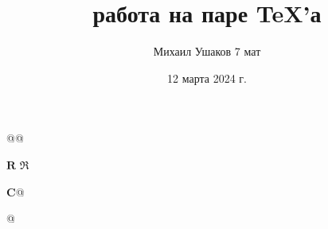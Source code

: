 \documentclass{article}
\title{\bfseries работа на паре \TeX'а}
\author{Михаил Ушаков 7 мат}
\date{12 марта 2024 г.}
\begin{document}
\maketitle

\makeatletter

\newcommand{\newset}[2][@]{
\if#1@                                 %
\newcommand{\R}{$\mathbf{#2}$}         %
\newcommand{\Rzvezda}{$\mathfrak{#2}$} %

\else
\newcommand{\complx}{#1}

\fi}
\makeatother

\newset{R}
\R
\Rzvezda

\newset[$\mathbf{C}$]{complx}
\complx
\end{document}
